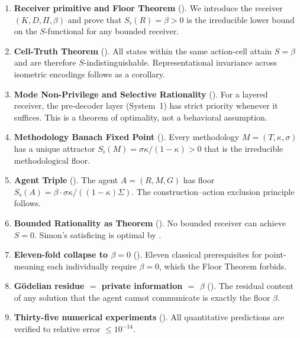 \documentclass[twocolumn,11pt,a4paper]{article}
\newcommand{\Sfloor}{S_{\flat}}
\begin{document}
\begin{enumerate}[label=(\roman*),leftmargin=*]
\item \textbf{Receiver primitive and Floor Theorem} ().
  We introduce the receiver $(K,D,\Pi,\beta)$ and prove that
  $\Sfloor(R)=\beta>0$ is the irreducible lower bound on the
  $S$-functional for any bounded receiver.

\item \textbf{Cell-Truth Theorem} ().  All states
  within the same action-cell attain $S=\beta$ and are therefore
  $S$-indistinguishable.  Representational invariance across isometric
  encodings follows as a corollary.

\item \textbf{Mode Non-Privilege and Selective Rationality}
  ().  For a layered receiver, the pre-decoder layer
  (System~1) has strict priority whenever it suffices.  This is a theorem
  of optimality, not a behavioral assumption.

\item \textbf{Methodology Banach Fixed Point} ().
  Every methodology $M=(T,\kappa,\sigma)$ has a unique attractor
  $\Sfloor(M)=\sigma\kappa/(1-\kappa)>0$ that is the irreducible
  methodological floor.

\item \textbf{Agent Triple} ().  The agent $A=(R,M,G)$ has
  floor $\Sfloor(A)=\beta\cdot\sigma\kappa/((1-\kappa)\Sigma)$.  The
  construction--action exclusion principle follows.

\item \textbf{Bounded Rationality as Theorem} ().
  No bounded receiver can achieve $S=0$.  Simon's satisficing is optimal by
  .

\item \textbf{Eleven-fold collapse to $\beta=0$} ().
  Eleven classical prerequisites for point-meaning each individually require
  $\beta=0$, which the Floor Theorem forbids.

\item \textbf{G\"odelian residue $=$ private information $=$ $\beta$}
  ().  The residual content of any solution that the
  agent cannot communicate is exactly the floor $\beta$.

\item \textbf{Thirty-five numerical experiments} ().
  All quantitative predictions are verified to relative error
  $\leq 10^{-14}$.
\end{enumerate}
\end{document}
